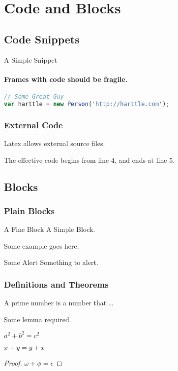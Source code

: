 \section{Code and Blocks}


\subsection{Code Snippets}


\begin{frame}[fragile]{A Simple Snippet}
\framesubtitle{Frames with code should be fragile.}
\begin{lstlisting}[language=JavaScript]
// Some Great Guy
var harttle = new Person('http://harttle.com');
\end{lstlisting}
\end{frame}


\begin{frame}[fragile]
\frametitle{External Code}
Latex allows external source files.

\bigskip
The effective code begins from line 4, and ends at line 5.

\end{frame}


\subsection{Blocks}


\begin{frame}
\frametitle{Plain Blocks}
\begin{block}{A Fine Block}
    A Simple Block.
\end{block}
\begin{example}
    Some example goes here.
\end{example} 
\begin{alertblock}{Some Alert}
    Something to alert.
\end{alertblock}
\end{frame}


\begin{frame}
\frametitle{Definitions and Theorems}
\begin{definition}
A prime number is a number that \ldots
\end{definition}
\begin{lemma}
Some lemma required.
\end{lemma}
\begin{theorem}[Pythagoras]
$ a^2 + b^2 = c^2$
\end{theorem}
\begin{corollary}
$ x + y = y + x  $
\end{corollary}
\begin{proof}
$\omega +\phi = \epsilon $
\end{proof}
\end{frame}
